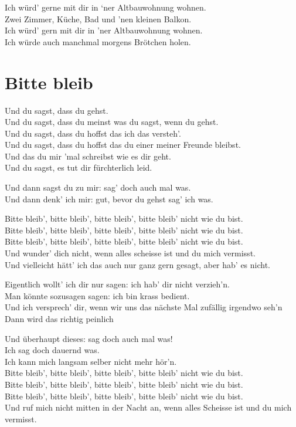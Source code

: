 \documentclass[]{book}
\begin{document}
Ich würd' gerne mit dir in `ner Altbauwohnung wohnen.\\
Zwei Zimmer, Küche, Bad und 'nen kleinen Balkon.\\
Ich würd' gern mit dir in 'ner Altbauwohnung wohnen.\\
Ich würde auch manchmal morgens Brötchen holen.

\hypertarget{bitte-bleib-1}{%
\section{Bitte bleib}\label{bitte-bleib-1}}

Und du sagst, dass du gehst.\\
Und du sagst, dass du meinst was du sagst, wenn du gehst.\\
Und du sagst, dass du hoffst das ich das versteh'.\\
Und du sagst, dass du hoffst das du einer meiner Freunde bleibst.\\
Und das du mir 'mal schreibst wie es dir geht.\\
Und du sagst, es tut dir fürchterlich leid.

Und dann sagst du zu mir: sag' doch auch mal was.\\
Und dann denk' ich mir: gut, bevor du gehst sag' ich was.

Bitte bleib', bitte bleib', bitte bleib', bitte bleib' nicht wie du bist.\\
Bitte bleib', bitte bleib', bitte bleib', bitte bleib' nicht wie du bist.\\
Bitte bleib', bitte bleib', bitte bleib', bitte bleib' nicht wie du bist.\\
Und wunder' dich nicht, wenn alles scheisse ist und du mich vermisst.\\
Und vielleicht hätt' ich das auch nur ganz gern gesagt, aber hab' es nicht.

Eigentlich wollt' ich dir nur sagen: ich hab' dir nicht verzieh'n.\\
Man könnte sozusagen sagen: ich bin krass bedient.\\
Und ich versprech' dir, wenn wir uns das nächste Mal zufällig irgendwo seh'n\\
Dann wird das richtig peinlich

Und überhaupt dieses: sag doch auch mal was!\\
Ich sag doch dauernd was.\\
Ich kann mich langsam selber nicht mehr hör'n.\\
Bitte bleib', bitte bleib', bitte bleib', bitte bleib' nicht wie du bist.\\
Bitte bleib', bitte bleib', bitte bleib', bitte bleib' nicht wie du bist.\\
Bitte bleib', bitte bleib', bitte bleib', bitte bleib' nicht wie du bist.\\
Und ruf mich nicht mitten in der Nacht an, wenn alles Scheisse ist und du mich vermisst.
\end{document}
